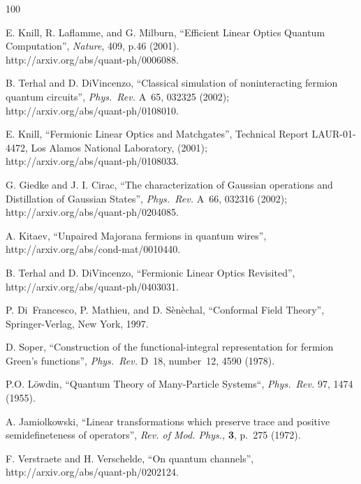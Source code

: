 \documentclass[twocolumn,showpacs,preprintnumbers,superscriptaddress]{revtex4}
\begin{document}
\begin{thebibliography}{100}

 E. Knill, R. Laflamme, and G. Milburn,
``Efficient Linear Optics Quantum Computation'',
{\it Nature}, 409, p.46 (2001).\\
http://arxiv.org/abs/quant-ph/0006088.


  B. Terhal and D. DiVincenzo,
``Classical simulation of noninteracting fermion quantum circuits'',
{\it Phys.~Rev.}  A~65, 032325  (2002);\\
http://arxiv.org/abs/quant-ph/0108010.

 E. Knill, ``Fermionic Linear Optics and Matchgates'',
Technical Report LAUR-01-4472, Los Alamos National Laboratory, (2001);\\
http://arxiv.org/abs/quant-ph/0108033.

 G. Giedke and J. I. Cirac, ``The characterization of Gaussian
operations and Distillation of Gaussian States'',
{\it Phys.~Rev.} A~66, 032316 (2002);\\
http://arxiv.org/abs/quant-ph/0204085.


  A. Kitaev, ``Unpaired Majorana fermions in quantum wires'',
http://arxiv.org/abs/cond-mat/0010440.

  B. Terhal and D. DiVincenzo,
``Fermionic Linear Optics Revisited'',
http://arxiv.org/abs/quant-ph/0403031.

 P. Di~Francesco, P. Mathieu, and D. S{\`e}n{\`e}chal,
``Conformal Field Theory'', Springer-Verlag, New York, 1997.

 D. Soper, ``Construction of the functional-integral representation
for fermion Green's functions'', {\it Phys.~Rev.} D~18, number~12, 4590 (1978).

P.O. L{\"o}wdin, 
``Quantum Theory of Many-Particle Systems``,
{\it Phys.~Rev.}  97, 1474 (1955).

A. Jamiolkowski, 
``Linear transformations which preserve trace and positive semidefineteness
of operators'', {\it Rev. of Mod. Phys., } 
{\bf 3}, p.~275  (1972).


 F. Verstraete and  H. Verschelde, ``On quantum channels'',\\ 
http://arxiv.org/abs/quant-ph/0202124.


\end{thebibliography}
\end{document}
